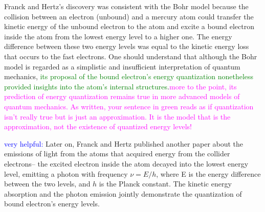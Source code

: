 \documentclass[prb,preprint]{revtex4-1}
\begin{document}
Franck and Hertz's discovery was consistent with the Bohr model because the collision between an electron (unbound) and a mercury atom could transfer the kinetic energy of the unbound electron to the atom and excite a bound electron inside the atom from the lowest energy level to a higher one. The energy difference between these two energy levels was equal to the kinetic energy loss that occurs to the fast electrons. One should understand that although the Bohr model is regarded as a simplistic and insufficient interpretation of quantum mechanics, \textcolor{green}{its proposal of the bound electron's energy quantization nonetheless provided insights into the atom's internal structures}.\textcolor{magenta}{more to the point, its prediction of energy quantization remains true in more advanced models of quantum mechanics. As written, your sentence in green reads as if quantization isn't really true but is just an approximation. It is the model that is the approximation, not the existence of quantized energy levels! } 

\textcolor{blue}{very helpful:} Later on, Franck and Hertz published another paper about the emissions of light from the atoms that acquired energy from the collider electrons-- the excited electron inside the atom decayed into the lowest energy level, emitting a photon with frequency $\nu=E/h$, where E is the energy difference between the two levels, and $h$ is the Planck constant. The kinetic energy absorption and the photon emission jointly demonstrate the quantization of bound electron's energy levels.
\end{document}
